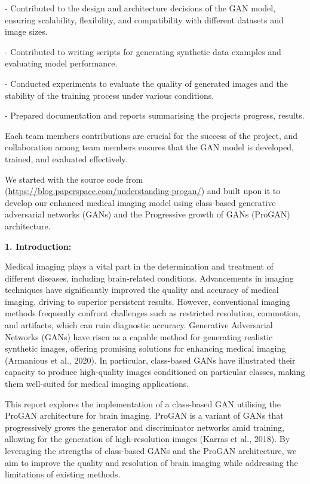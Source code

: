 \documentclass[
]{article}
\begin{document}
- Contributed to the design and architecture decisions of the GAN model,
ensuring scalability, flexibility, and compatibility with different
datasets and image sizes.

- Contributed to writing scripts for generating synthetic data examples
and evaluating model performance.

- Conducted experiments to evaluate the quality of generated images and
the stability of the training process under various conditions.

- Prepared documentation and reports summarising the
project\textquotesingle s progress, results.

Each team member\textquotesingle s contributions are crucial for the
success of the project, and collaboration among team members ensures
that the GAN model is developed, trained, and evaluated effectively.

We started with the source code from
(\href{https://blog.paperspace.com/understanding-progan/}{\uline{https://blog.paperspace.com/understanding-progan/}})
and built upon it to develop our enhanced medical imaging model using
class-based generative adversarial networks (GANs) and the Progressive
growth of GANs (ProGAN) architecture.
\pagebreak

\textbf{1. Introduction:}

Medical imaging plays a vital part in the determination and treatment of
different diseases, including brain-related conditions. Advancements in
imaging techniques have significantly improved the quality and accuracy
of medical imaging, driving to superior persistent results. However,
conventional imaging methods frequently confront challenges such as
restricted resolution, commotion, and artifacts, which can ruin
diagnostic accuracy. Generative Adversarial Networks (GANs) have risen
as a capable method for generating realistic synthetic images, offering
promising solutions for enhancing medical imaging (Armanious et al.,
2020). In particular, class-based GANs have illustrated their capacity
to produce high-quality images conditioned on particular classes, making
them well-suited for medical imaging applications.

This report explores the implementation of a class-based GAN utilising
the ProGAN architecture for brain imaging. ProGAN is a variant of GANs
that progressively grows the generator and discriminator networks amid
training, allowing for the generation of high-resolution images (Karras
et al., 2018). By leveraging the strengths of class-based GANs and the
ProGAN architecture, we aim to improve the quality and resolution of
brain imaging while addressing the limitations of existing methods.
\end{document}

